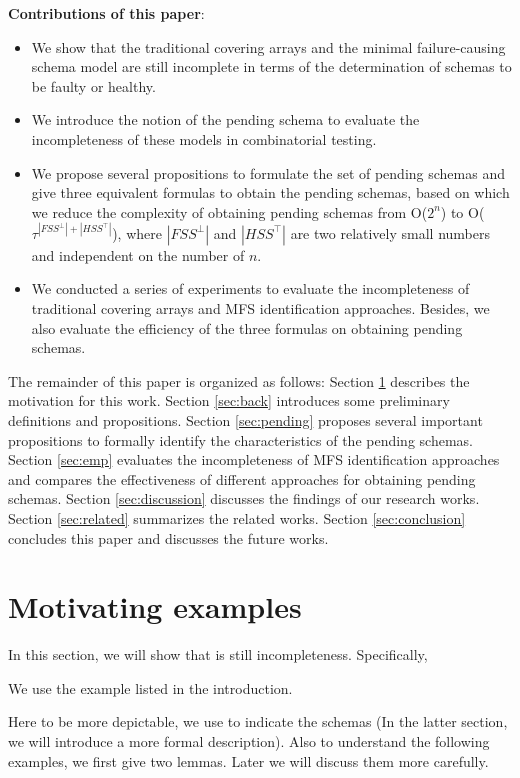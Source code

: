 \textbf{Contributions of this paper}:
\begin{itemize}

  \item We show that the traditional covering arrays and the minimal failure-causing schema model are still incomplete in terms of the determination of schemas to be faulty or healthy.
  \item We introduce the notion of the pending schema to evaluate the incompleteness of these models in combinatorial testing.
  \item We propose several propositions to formulate the set of pending schemas and give three equivalent formulas to obtain the pending schemas, based on which we reduce the complexity of obtaining pending schemas from O($2^{n}$) to O($ \tau^{|FSS^{\bot}|+|HSS^{\top}|}$), where $|FSS^{\bot}|$ and $|HSS^{\top}|$ are two relatively small numbers and independent on the number of $n$.
  \item We conducted a series of experiments to evaluate the incompleteness of traditional covering arrays and MFS identification approaches. Besides, we also evaluate the efficiency of the three formulas on obtaining pending schemas.
\end{itemize}

The remainder of this paper is organized as follows: Section \ref{sec:motiv} describes the motivation for this work. Section \ref{sec:back} introduces some preliminary definitions and propositions. Section \ref{sec:pending} proposes several important propositions to formally identify the characteristics of the pending schemas. Section \ref{sec:emp} evaluates the incompleteness of MFS identification approaches and compares the effectiveness of different approaches for obtaining pending schemas. Section \ref{sec:discussion} discusses the findings of our research works.  Section \ref{sec:related} summarizes the related works. Section \ref{sec:conclusion} concludes this paper and discusses the future works.


\section{Motivating examples}\label{sec:motiv}

In this section, we will show that is still incompleteness. Specifically,

We use the example listed in the introduction.

Here to be more depictable, we use to indicate the schemas (In the latter section, we will introduce a more formal description). Also to understand the following examples, we first give two lemmas. Later we will discuss them more carefully.
 
